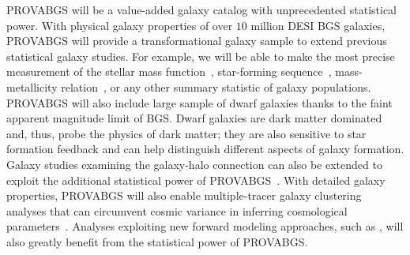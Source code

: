 {\sc PROVABGS} will be a value-added galaxy catalog with unprecedented
statistical power. 
With physical galaxy properties of over $10$ million DESI BGS galaxies, 
{\sc PROVABGS} will provide a transformational galaxy sample to extend
previous statistical galaxy studies. 
For example, we will be able to make the most precise measurement of the
stellar mass function~\citep[SMF]{li2009, moustakas2013}, star-forming
sequence~\citep{noeske2007}, mass-metallicity relation~\citep{tremonti2004}, or
any other summary statistic of galaxy populations. 
{\sc PROVABGS} will also include large sample of dwarf galaxies thanks to the
faint apparent magnitude limit of BGS. 
Dwarf galaxies are dark matter dominated and, thus, probe the physics of
dark matter; they are also sensitive to star formation feedback and can help
distinguish different aspects of galaxy formation. 
Galaxy studies examining the galaxy-halo connection can also be extended to
exploit the additional statistical power of {\sc
PROVABGS}~\citep[\emph{e.g.}][]{tinker2011, wetzel2013, zu2015, hahn2017,
hahn2019b}. 
With detailed galaxy properties, {\sc PROVABGS} will also enable
multiple-tracer galaxy clustering analyses that can circumvent cosmic variance
in inferring cosmological parameters~\citep{seljak2009, mcdonald2009,
wang2020}.
Analyses exploiting new forward modeling approaches, such as \cite{hahn2021},
will also greatly benefit from the statistical power of {\sc PROVABGS}.

